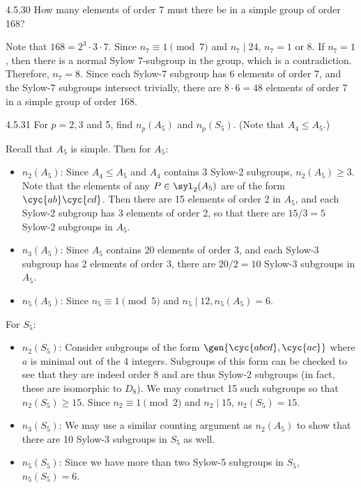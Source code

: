 \begin{exercise}{4.5.30}
	How many elements of order 7 must there be in a simple group of order 168?
\end{exercise}

\begin{sol}
	Note that $168 = 2^3 \cdot 3 \cdot 7$.
	Since $n_7 \equiv 1 \pmod 7$ and $n_7 \mid 24$, $n_7 = 1$ or $8$.
	If $n_7 = 1$, then there is a normal Sylow 7-subgroup in the group, which is a contradiction.
	Therefore, $n_7 = 8$.
	Since each Sylow-7 subgroup has 6 elements of order 7, and the Sylow-7 subgroups intersect trivially, there are $8 \cdot 6 = 48$ elements of order 7 in a simple group of order 168.
\end{sol}

\begin{exercise}{4.5.31}
	For $p = 2, 3$ and 5, find $n_p(A_5)$ and $n_p(S_5)$. (Note that $A_4 \leq A_5$.)
\end{exercise}

\begin{sol}
	Recall that $A_5$ is simple.
	Then for $A_5$:
	\begin{itemize}
		\item $n_2(A_5)$: Since $A_4 \leq A_5$ and $A_4$ contains 3 Sylow-2 subgroups, $n_2(A_5) \geq 3$.
	Note that the elements of any $P \in \syl_2(A_5)$ are of the form $\cyc{a b}\cyc{c d}$.
	Then there are 15 elements of order 2 in $A_5$, and each Sylow-2 subgroup has 3 elements of order 2, so that there are $15/3 = 5$ Sylow-2 subgroups in $A_5$.
		\item $n_3(A_5)$: Since $A_5$ contains 20 elements of order 3, and each Sylow-3 subgroup has 2 elements of order 3, there are $20/2 = 10$ Sylow-3 subgroups in $A_5$.
		\item $n_5(A_5)$: Since $n_5 \equiv 1 \pmod 5$ and $n_5 \mid 12, n_5(A_5) = 6$.
	\end{itemize}
	For $S_5$:
	\begin{itemize}
		\item $n_2(S_5)$: Consider subgroups of the form $\gen{\cyc{a b c d}, \cyc{a c}}$ where $a$ is minimal out of the 4 integers.
	Subgroups of this form can be checked to see that they are indeed order 8 and are thus Sylow-2 subgroups (in fact, these are isomorphic to $D_8$).
	We may construct 15 such subgroups so that $n_2(S_5) \geq 15$.
	Since $n_2 \equiv 1 \pmod 2$ and $n_2 \mid 15$, $n_2(S_5) = 15$.
		\item $n_3(S_5)$: We may use a similar counting argument as $n_2(A_5)$ to show that there are 10 Sylow-3 subgroups in $S_5$ as well.
		\item $n_5(S_5)$: Since we have more than two Sylow-5 subgroups in $S_5$, $n_5(S_5) = 6$.
	\end{itemize}	
\end{sol}

